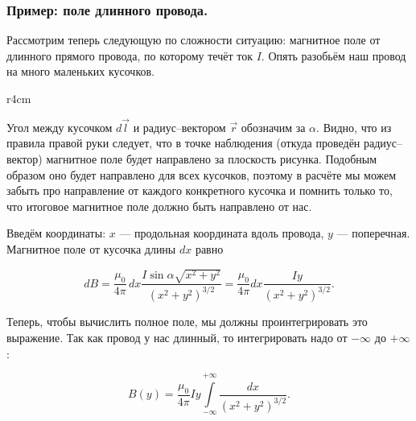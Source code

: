 \documentclass[a4paper,12pt]{article}
\numberwithin{equation}{section}
\begin{document}
\subsubsection{Пример: поле длинного провода.}
\label{sec:wire_current}

Рассмотрим теперь следующую по сложности ситуацию: магнитное поле от
длинного прямого провода, по которому течёт ток $I$. Опять разобьём
наш провод на много маленьких кусочков. 

\begin{wrapfigure}{r}{4cm}
\centering
{}
\label{fig:current_wire}
\end{wrapfigure}

Угол между кусочком $d\vec{l}$ и радиус--вектором $\vec{r}$ обозначим
за $\alpha$. Видно, что из правила правой руки следует, что в точке
наблюдения (откуда проведён радиус--вектор) магнитное поле будет
направлено за плоскость рисунка. Подобным образом оно будет направлено
для всех кусочков, поэтому в расчёте мы можем забыть про направление
от каждого конкретного кусочка и помнить только то, что итоговое
магнитное поле должно быть направлено от нас. 

Введём координаты: $x$ --- продольная координата вдоль провода,
$y$ --- поперечная. Магнитное поле от кусочка длины $dx$ равно

\begin{equation}
  \label{eq:wire_current_1}
  dB = \frac{\mu_{0}}{4\pi}\,dx \frac{I \sin \alpha
    \sqrt{x^2+y^2}}{\left(x^2+y^2\right)^{3/2}} = \frac{\mu_0}{4\pi} dx \frac{I
  y}{\left(x^2+y^2\right)^{3/2}}.
\end{equation}

Теперь, чтобы вычислить полное поле, мы должны проинтегрировать это
выражение. Так как провод у нас длинный, то интегрировать надо от
$-\infty$ до $+\infty$: 

\begin{equation}
  \label{eq:wire_current_2}
  B(y) = \frac{\mu_0}{4\pi} Iy \int\limits_{-\infty}^{+\infty} \frac{dx}{\left(x^2+y^2\right)^{3/2}} .
\end{equation}
\end{document}
